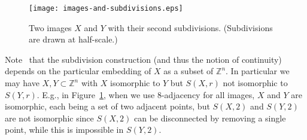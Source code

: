 \documentclass{article}
\theoremstyle{plain}
\theoremstyle{definition}
\numberwithin{thm}{section}
\def\Z{{\mathbb Z}}
\begin{document}
\begin{comment}
\begin{figure}
\begin{center}
\begin{tabular}{cccc}
\begin{tikzpicture}[scale=.4]
\foreach \x/\y in {1/0,0/1} {
	\filldraw[fill=gray, xshift=2*\x cm,yshift=2*\y cm]
		(45:1.2) \foreach \t in {135,225,315,45} { -- (\t:1.2) };
}
\end{tikzpicture}\qquad
&
\begin{tikzpicture}[scale=.2]
\foreach \x/\y in {2/0,2/1,3/0,3/1,0/2,0/3,1/2,1/3} {
	\filldraw[fill=gray, xshift=2*\x cm,yshift=2*\y cm]
		(45:1.2) \foreach \t in {135,225,315,45} { -- (\t:1.2) };
}
\end{tikzpicture}\qquad
&
\begin{tikzpicture}[scale=.4]
\foreach \x/\y in {0/0,0/1} {
	\filldraw[fill=gray, xshift=2*\x cm,yshift=2*\y cm]
		(45:1.2) \foreach \t in {135,225,315,45} { -- (\t:1.2) };
}
\end{tikzpicture}\qquad
&
\begin{tikzpicture}[scale=.2]
\foreach \x/\y in {0/0,0/1,1/0,1/1,0/2,0/3,1/2,1/3} {
	\filldraw[fill=gray, xshift=2*\x cm,yshift=2*\y cm]
		(45:1.2) \foreach \t in {135,225,315,45} { -- (\t:1.2) };
}
\end{tikzpicture}
\\
$X$ & $S(X,2)$ & $Y$ & $S(Y,2)$
\end{tabular}
\end{comment}
\begin{figure}
\texttt{[image: images-and-subdivisions.eps]}
\begin{center}
\caption{\cite{BoxSta16} Two images $X$ and $Y$ with their second subdivisions. (Subdivisions are drawn at half-scale.)
\label{subdivfig}}
\end{center}
\end{figure}

Note~\cite{BoxSta16} that the subdivision construction (and thus the notion of continuity) depends on the particular embedding of $X$ as a subset of $\Z^n$. In particular we may have $X, Y \subset \Z^n$ with $X$ isomorphic to $Y$ but $S(X,r)$ not isomorphic to $S(Y,r)$. 
E.g., in Figure~\ref{subdivfig}, when we use 8-adjacency for all images, $X$ and $Y$ are isomorphic, each being a set of two adjacent points, but $S(X,2)$ and $S(Y,2)$ are not isomorphic since $S(X,2)$ can be disconnected by removing a single point, while this is impossible in $S(Y,2)$. 
\end{document}
